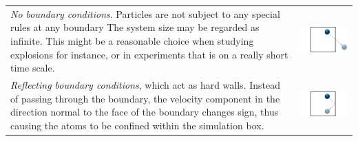 \documentclass[twoside,english]{uiofysmaster}
\begin{document}
\hspace{-9.37mm}
\begin{tabular}{p{} p{}}
	\vspace{0pt}  {\it No boundary conditions}. Particles are not subject to any special rules at any boundary The system size may be regarded as infinite. This  might be a reasonable choice when studying explosions for instance, or in experiments that is on a really short time scale.  
	& \vspace{0pt} \hspace*{-1.3cm} \includegraphics[width=1.3\linewidth]{figures/BoundaryConditions/no.pdf} 
	\\*
	\vspace{0pt} {\it Reflecting boundary conditions}, which act as hard walls. Instead of passing through the boundary, the velocity component in the direction normal to the face of the boundary changes sign, thus causing the atoms to be confined within the simulation box. 
	& \vspace{0pt} \hspace*{-1.3cm} \includegraphics[width=1.3\linewidth]{figures/BoundaryConditions/reflecting.pdf} 
	\\*

\end{tabular}
\end{document}
